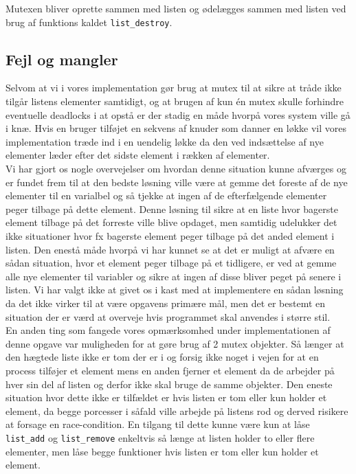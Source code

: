 \documentclass[main.tex]{subfile}
\begin{document}
Mutexen bliver oprette sammen med listen og ødelægges sammen med listen ved brug af funktions kaldet \texttt{list\_destroy}.

\subsection{Fejl og mangler}
Selvom at vi i vores implementation gør brug at mutex til at sikre at tråde ikke tilgår listens elementer samtidigt, og at brugen af kun én mutex skulle forhindre eventuelle deadlocks i at opstå er der stadig en måde hvorpå vores system ville gå i knæ. Hvis en bruger tilføjet en sekvens af knuder som danner en løkke vil vores implementation træde ind i en uendelig løkke da den ved indsættelse af nye elementer læder efter det sidste element i rækken af elementer.\\

Vi har gjort os nogle overvejelser om hvordan denne situation kunne afværges og er fundet frem til at den bedste løsning ville være at gemme det foreste af de nye elementer til en varialbel og så tjekke at ingen af de efterfælgende elementer peger tilbage på dette element. Denne løsning til sikre at en liste hvor bagerste element tilbage på det forreste ville blive opdaget, men samtidig udelukker det ikke situationer hvor fx bagerste element peger tilbage på det anded element i listen. Den enestå måde hvorpå vi har kunnet se at det er muligt at afvære en sådan situation, hvor et element peger tilbage på et tidligere, er ved at gemme alle nye elementer til variabler og sikre at ingen af disse bliver peget på senere i listen. Vi har valgt ikke at givet os i kast med at implementere en sådan løsning da det ikke virker til at være opgavens primære mål, men det er bestemt en situation der er værd at overveje hvis programmet skal anvendes i større stil.\\

En anden ting som fangede vores opmærksomhed under implementationen af denne opgave var muligheden for at gøre brug af 2 mutex objekter. Så længer at den hægtede liste ikke er tom der er i og forsig ikke noget i vejen for at en process tilføjer et element mens en anden fjerner et element da de arbejder på hver sin del af listen og derfor ikke skal bruge de samme objekter. Den eneste situation hvor dette ikke er tilfældet er hvis listen er tom eller kun holder et element, da begge porcesser i såfald ville arbejde på listens rod og derved risikere at forsage en race-condition. En tilgang til dette kunne være kun at låse \texttt{list\_add} og \texttt{list\_remove} enkeltvis så længe at listen holder to eller flere elementer, men låse begge funktioner hvis listen er tom eller kun holder et element.
\end{document}
